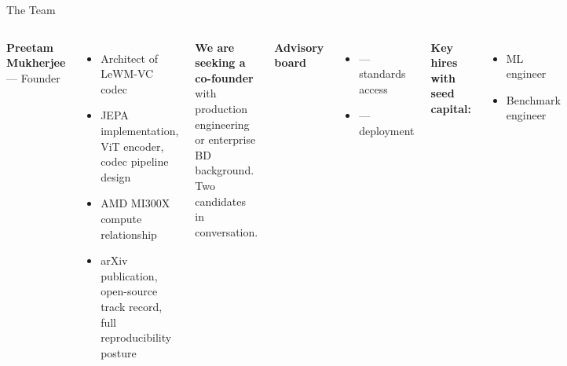\documentclass[aspectratio=169, professionalfonts, 10pt]{beamer}
\begin{document}
\begin{frame}{The Team}

  \begin{columns}[t]
    \textbf{Preetam Mukherjee} --- Founder \\
    \begin{itemize}
      \item Architect of LeWM-VC codec \\
      \item JEPA implementation, ViT encoder, codec pipeline design \\
      \item AMD MI300X compute relationship \\
      \item arXiv publication, open-source track record,
            full reproducibility posture
    \end{itemize}

    \bigskip
    \textbf{We are seeking a co-founder} with production engineering
    or enterprise BD background. Two candidates in conversation.

    \textbf{Advisory board} \\
    \begin{itemize}
      \item [HEVC contributor or MPEG VCM participant] --- standards access \\
      \item [Production ML engineer] --- deployment
    \end{itemize}

    \bigskip
    \textbf{Key hires with seed capital:} \\
    \begin{itemize}
      \item ML engineer \\
      \item Benchmark engineer \\
    \end{itemize}
  \end{columns}
\end{frame}
\end{document}
